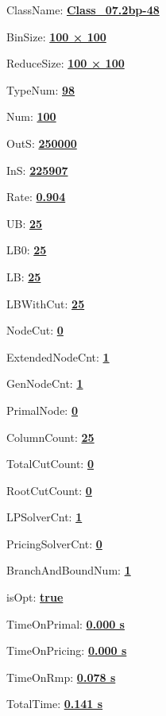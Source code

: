 \documentclass[11pt]{article}
\begin{document}
\pagestyle{empty}


ClassName: \underline{\textbf{Class_07.2bp-48}}
\par
BinSize: \underline{\textbf{100 × 100}}
\par
ReduceSize: \underline{\textbf{100 × 100}}
\par
TypeNum: \underline{\textbf{98}}
\par
Num: \underline{\textbf{100}}
\par
OutS: \underline{\textbf{250000}}
\par
InS: \underline{\textbf{225907}}
\par
Rate: \underline{\textbf{0.904}}
\par
UB: \underline{\textbf{25}}
\par
LB0: \underline{\textbf{25}}
\par
LB: \underline{\textbf{25}}
\par
LBWithCut: \underline{\textbf{25}}
\par
NodeCut: \underline{\textbf{0}}
\par
ExtendedNodeCnt: \underline{\textbf{1}}
\par
GenNodeCnt: \underline{\textbf{1}}
\par
PrimalNode: \underline{\textbf{0}}
\par
ColumnCount: \underline{\textbf{25}}
\par
TotalCutCount: \underline{\textbf{0}}
\par
RootCutCount: \underline{\textbf{0}}
\par
LPSolverCnt: \underline{\textbf{1}}
\par
PricingSolverCnt: \underline{\textbf{0}}
\par
BranchAndBoundNum: \underline{\textbf{1}}
\par
isOpt: \underline{\textbf{true}}
\par
TimeOnPrimal: \underline{\textbf{0.000 s}}
\par
TimeOnPricing: \underline{\textbf{0.000 s}}
\par
TimeOnRmp: \underline{\textbf{0.078 s}}
\par
TotalTime: \underline{\textbf{0.141 s}}
\par
\newpage


\end{document}
